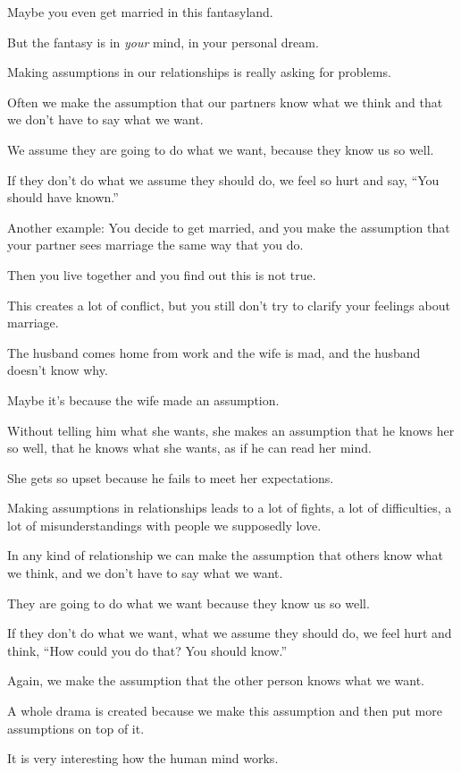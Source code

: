 \documentclass{article}
\numberwithin{equation}{section}
\begin{document}
Maybe you even get married in this fantasyland.

But the fantasy is in \textit{your} mind, in your personal dream.

%
Making assumptions in our relationships is really asking for problems.

Often we make the assumption that our partners know what we think and that we don't have to say what we want.

We assume they are going to do what we want, because they know us so well.

If they don't do what we assume they should do, we feel so hurt and say, ``You should have known.''

%
Another example: You decide to get married, and you make the assumption that your partner sees marriage the same way that you do.

Then you live together and you find out this is not true.

This creates a lot of conflict, but you still don't try to clarify your feelings about marriage.

The husband comes home from work and the wife is mad, and the husband doesn't know why.

Maybe it's because the wife made an assumption.

Without telling him what she wants, she makes an assumption that he knows her so well, that he knows what she wants, as if he can read her mind.

She gets so upset because he fails to meet her expectations.

Making assumptions in relationships leads to a lot of fights, a lot of difficulties, a lot of misunderstandings with people we supposedly love.

%
In any kind of relationship we can make the assumption that others know what we think, and we don't have to say what we want.

They are going to do what we want because they know us so well.

If they don't do what we want, what we assume they should do, we feel hurt and think, ``How could you do that? You should know.''

Again, we make the assumption that the other person knows what we want.

A whole drama is created because we make this assumption and then put more assumptions on top of it.

%
It is very interesting how the human mind works.
\end{document}

